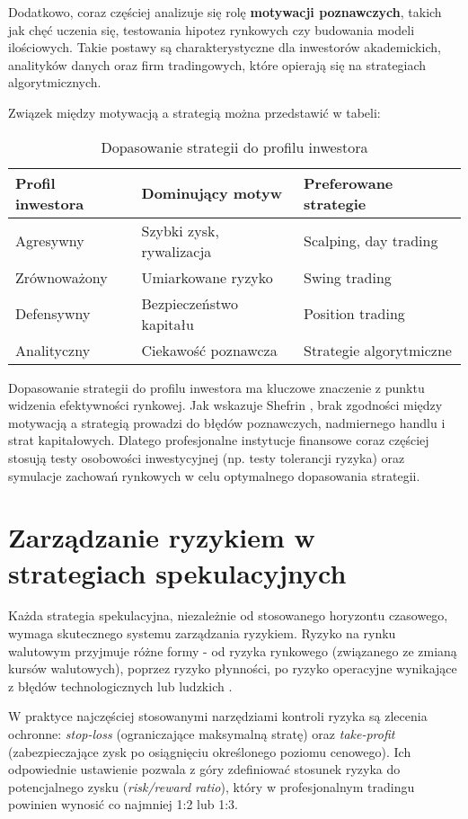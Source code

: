 Dodatkowo, coraz częściej analizuje się rolę \textbf{motywacji poznawczych}, takich jak chęć uczenia się, testowania hipotez rynkowych czy budowania modeli ilościowych. 
Takie postawy są charakterystyczne dla inwestorów akademickich, analityków danych oraz firm tradingowych, które opierają się na strategiach algorytmicznych.

Związek między motywacją a strategią można przedstawić w tabeli:

\begin{table}[h!]
\centering
\caption{Dopasowanie strategii do profilu inwestora}
\begin{tabular}{lll}
\hline
Profil inwestora & Dominujący motyw & Preferowane strategie \\
\hline
Agresywny   & Szybki zysk, rywalizacja & Scalping, day trading \\
Zrównoważony& Umiarkowane ryzyko       & Swing trading \\
Defensywny  & Bezpieczeństwo kapitału  & Position trading \\
Analityczny & Ciekawość poznawcza      & Strategie algorytmiczne \\
\hline
\end{tabular}
\end{table}

Dopasowanie strategii do profilu inwestora ma kluczowe znaczenie z punktu widzenia efektywności rynkowej. 
Jak wskazuje Shefrin \parencite{shefrin2007}, brak zgodności między motywacją a strategią prowadzi do błędów poznawczych, nadmiernego handlu i strat kapitałowych. 
Dlatego profesjonalne instytucje finansowe coraz częściej stosują testy osobowości inwestycyjnej (np. testy tolerancji ryzyka) oraz symulacje zachowań rynkowych w celu optymalnego dopasowania strategii.

\section{Zarządzanie ryzykiem w strategiach spekulacyjnych}

Każda strategia spekulacyjna, niezależnie od stosowanego horyzontu czasowego, wymaga skutecznego systemu zarządzania ryzykiem. 
Ryzyko na rynku walutowym przyjmuje różne formy - od ryzyka rynkowego (związanego ze zmianą kursów walutowych), poprzez ryzyko płynności, 
po ryzyko operacyjne wynikające z błędów technologicznych lub ludzkich \parencite{hull2018}. 

W praktyce najczęściej stosowanymi narzędziami kontroli ryzyka są zlecenia ochronne: 
\emph{stop-loss} (ograniczające maksymalną stratę) oraz \emph{take-profit} (zabezpieczające zysk po osiągnięciu określonego poziomu cenowego). 
Ich odpowiednie ustawienie pozwala z góry zdefiniować stosunek ryzyka do potencjalnego zysku (\emph{risk/reward ratio}), który w profesjonalnym tradingu powinien wynosić co najmniej 1:2 lub 1:3. 

